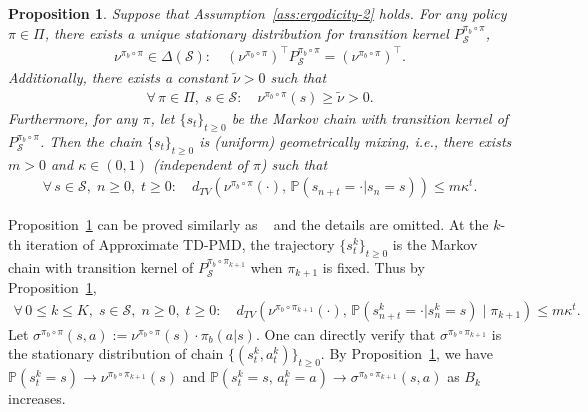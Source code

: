 \documentclass[10pt]{article}
\newcommand{\calS}{\mathcal{S}}
\renewcommand{\P}{\mathbb{P}}
\theoremstyle{plain}
\newtheorem{proposition}[theorem]{Proposition}
\theoremstyle{definition}
\begin{document}
\begin{proposition}
    Suppose that Assumption~\ref{ass:ergodicity-2} holds. For any policy $\pi\in\Pi$, there exists a unique stationary distribution for transition kernel $P^{\pi_b\circ\pi}_{\scriptscriptstyle\calS}$,
    \begin{align*}
        \nu^{\pi_b\circ\pi} \in \Delta(\calS): \quad (\nu^{\pi_b\circ\pi})^\top P^{\pi_b\circ\pi}_{\scriptscriptstyle\calS} = (\nu^{\pi_b\circ\pi})^\top.
    \end{align*}
    Additionally, there exists a constant $\tilde\nu > 0$ such that 
    \begin{align*}
        \forall\, \pi \in \Pi, \; s\in\calS: \quad \nu^{\pi_b\circ\pi}(s) \geq \tilde\nu > 0.
    \end{align*}
    Furthermore, for any $\pi$, let $\{ s_t \}_{t\geq 0}$ be the Markov chain with transition kernel of $P^{\pi_b\circ\pi}_{\scriptscriptstyle\calS}$. Then the chain $\{ s_t \}_{t\geq0}$ is \textup{(}uniform\textup{)} geometrically mixing, i.e., there exists $m > 0$ and $\kappa \in (0,1)$ \textup{(}independent of $\pi$\textup{)} such that
    \begin{align*}
        \forall\, s\in\calS, \; n \geq 0, \; t \geq 0: \quad d_{TV}(\nu^{\pi_b\circ\pi}(\cdot), \, \P(s_{n+t} = \cdot | s_n = s)) \leq m \kappa^t.
    \end{align*}
    \label{pro:MDP-ergodicity-2}
\end{proposition}

Proposition~\ref{pro:MDP-ergodicity-2} can be proved similarly as ~\citet[Lemma~7]{khodadadian2022finite} and the details are omitted. At the $k$-th iteration of Approximate TD-PMD, the trajectory $\{ s_t^k \}_{t\geq0}$ is the Markov chain with transition kernel of $P^{\pi_b\circ\pi_{k+1}}_{\scriptscriptstyle\calS}$ when $\pi_{k+1}$ is fixed. Thus by Proposition~\ref{pro:MDP-ergodicity-2},
\begin{align}
    \forall\, 0\leq k \leq K, \; s\in\calS, \; n \geq 0, \; t \geq 0: \quad d_{TV}(\nu^{\pi_b\circ\pi_{k+1}}(\cdot), \, \P(s_{n+t}^k = \cdot | s_n^k = s) \; \big| \; \pi_{k+1}) \leq m \kappa^t.
    \label{eq:Approximated-TD-AC-PMD:MDP-ergodicity}
\end{align}
Let $\sigma^{\pi_b\circ\pi}(s,a) := \nu^{\pi_b\circ\pi}(s) \cdot \pi_b(a|s)$. One can directly verify that $\sigma^{\pi_b\circ\pi_{k+1}}$ is the stationary distribution of chain $\{ (s_t^k, a_t^k) \}_{t\geq0}$. By Proposition~\ref{pro:MDP-ergodicity-2}, we have $\P(s_t^k = s) \to \nu^{\pi_b\circ\pi_{k+1}}(s)$ and $\P(s^k_t=s, \, a^k_t=a) \to \sigma^{\pi_b\circ\pi_{k+1}}(s,a)$ as $B_k$ increases. 
\end{document}
